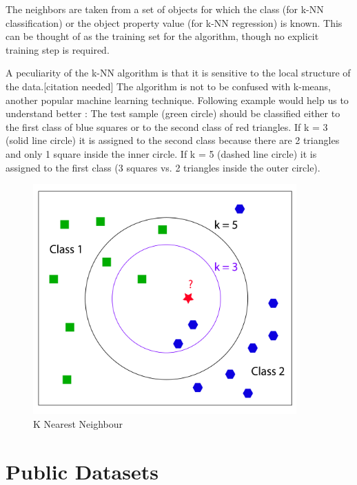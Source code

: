 The neighbors are taken from a set of objects for which the class (for k-NN classification) or the object property value (for k-NN regression) is known. This can be thought of as the training set for the algorithm, though no explicit training step is required.

A peculiarity of the k-NN algorithm is that it is sensitive to the local structure of the data.[citation needed] The algorithm is not to be confused with k-means, another popular machine learning technique. 
 Following example would help us to understand better :
 The test sample (green circle) should be classified either to the first class of blue squares or to the second class of red triangles. If k = 3 (solid line circle) it is assigned to the second class because there are 2 triangles and only 1 square inside the inner circle. If k = 5 (dashed line circle) it is assigned to the first class (3 squares vs. 2 triangles inside the outer circle). 
\begin{figure}
    \includegraphics[width=0.9\textwidth]{images/knn.png}
    \caption{K Nearest Neighbour}
    \label{fig:my_label}
\end{figure}

\section{Public Datasets}

